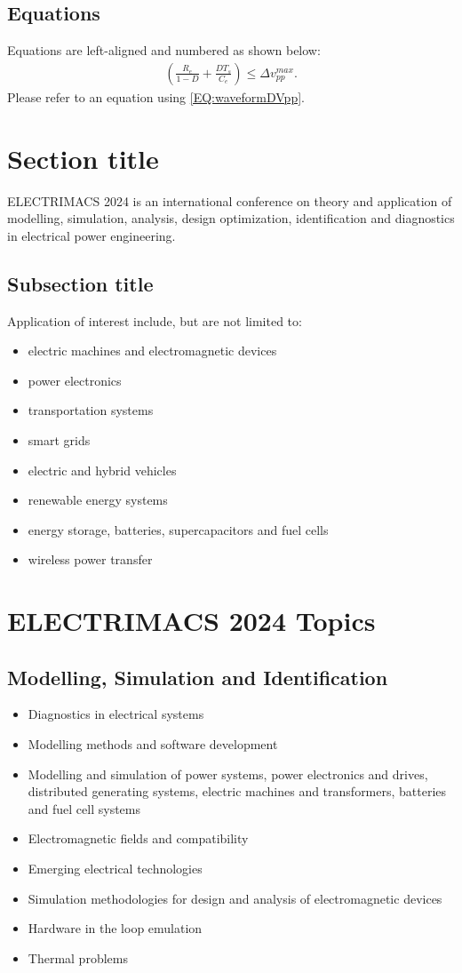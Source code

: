 \documentclass[smallextended,twocolumn]{electrimacs2024}
\begin{document}
\subsection{Equations}
Equations are left-aligned and numbered as shown below:
\begin{align}
\left(\frac{R_e}{1-D}+\frac{DT_s}{C_e}\right)\le \Delta v_{pp}^{max}.\label{EQ:waveformDVpp}
\end{align}
Please refer to an equation using \eqref{EQ:waveformDVpp}.

\section{Section title}
ELECTRIMACS 2024 is an international conference on theory and application of modelling, simulation, analysis, design optimization, identification and diagnostics in electrical power engineering.

\subsection{Subsection title}
Application of interest include, but are not limited to:
\begin{itemize}
\item  electric machines and electromagnetic devices
\item  power electronics
\item  transportation systems
\item  smart grids
\item  electric and hybrid vehicles
\item  renewable energy systems
\item  energy storage, batteries, supercapacitors and fuel cells
\item  wireless power transfer
\end{itemize}


\section{ELECTRIMACS 2024 Topics}

\subsection{Modelling, Simulation and Identification}
\begin{itemize}
\item Diagnostics in electrical systems 
\item Modelling methods and software development
\item Modelling and simulation of power systems, power electronics and drives, distributed generating systems, electric machines and transformers, batteries and fuel cell systems
\item Electromagnetic fields and compatibility
\item Emerging electrical technologies
\item Simulation methodologies for design and analysis of electromagnetic devices
\item Hardware in the loop emulation
\item Thermal problems
\end{itemize}
 
\end{document}
